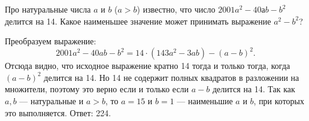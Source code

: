 

\begin{itemize}

\itC Про натуральные числа $a$ и $b$ ($a>b$) известно, что число $2001a^2-40аb-b^2$ делится на 14.
Какое наименьшее значение может принимать выражение $a^2-b^2$?

\itr Преобразуем выражение:
$$
2001a^2-40ab-b^2=14\cdot(143a^2-3ab)-(a-b)^2.
$$
Отсюда видно, что  исходное выражение кратно 14 тогда и только тогда, когда $(a-b)^2$ 
делится на 14. Но 14 не содержит полных квадратов в разложении на множители, поэтому 
это верно если и только если $a-b$ делится на 14. Так как $a,b$ --- натуральные и $a>b$, 
то $a=15$ и $b=1$ --- наименьшие $a$ и $b$, при которых это выполняется. 
Ответ: 224.

\end{itemize}
